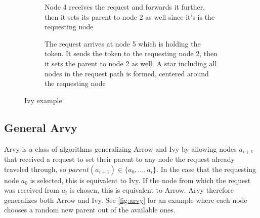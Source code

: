 \documentclass[a4paper, oneside]{discothesis}
\begin{document}
\begin{figure}[H]
\begin{subfigure}[t]{0.5\textwidth}
\centering
{}
\caption{Node 4 receives the request and forwards it further, then it sets its parent to node 2 as well since it's is the requesting node}
\end{subfigure}
\quad
\begin{subfigure}[t]{0.5\textwidth}
\centering
{}
\caption{The request arrives at node 5 which is holding the token. It sends the token to the requesting node 2, then it sets the parent to node 2 as well. A star including all nodes in the request path is formed, centered around the requesting node}
\end{subfigure}
\caption{Ivy example}
\label{fig:ivy}
\end{figure}

\subsection{General Arvy}

Arvy is a class of algorithms generalizing Arrow and Ivy by allowing nodes $a_{i+1}$ that received a request to set their parent to any node the request already traveled through, so $parent(a_{i+1})\in\{a_{0},\dots,a_{i}\}$. In the case that the requesting node $a_0$ is selected, this is equivalent to Ivy. If the node from which the request was received from $a_i$ is chosen, this is equivalent to Arrow. Arvy therefore generalizes both Arrow and Ivy. See \autoref{fig:arvy} for an example where each node chooses a random new parent out of the available ones.
\end{document}
